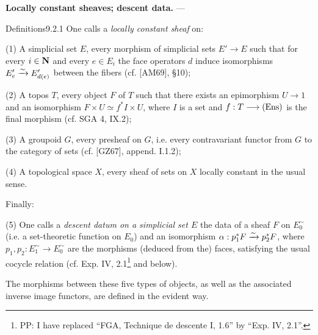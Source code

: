 \textbf{Locally constant sheaves; descent data.} ---
\begin{enoncerm}{Definitions}{9.2.1}\label{X.9.2.1}
One calls a \emph{locally constant sheaf} on:

(1) A simplicial set $E$, every morphism of simplicial sets $E'\to E$ such that for every $i\in\mathbf{N}$ and every $e\in E_i$ the face operators $d$ induce isomorphisms $E'_e\xrightarrow{\sim} E'_{d(e)}$ between the fibers (cf. [AM69], \S10);

(2) A topos $T$, every object $F$ of $T$ such that there exists an epimorphism $U\to1$ and an isomorphism $F\times U\simeq f^*I\times U$, where $I$ is a set and $f:T\longrightarrow\textup{(Ens)}$ is the final morphism (cf. SGA 4, IX.2);

(3) A groupoid $G$, every presheaf on $G$, i.e. every contravariant functor from $G$ to the category of sets (cf. [GZ67], append. I.1.2);

(4) A topological space $X$, every sheaf of sets on $X$ locally constant in the usual sense.

Finally:

(5) One calls a \emph{descent datum on a simplicial set $E$} the data of a sheaf $F$ on $E_0^\sim$ (i.e. a set-theoretic function on $E_0$) and an isomorphism $\alpha:p_1^*F\xrightarrow{\sim} p_2^*F$, where $p_1,p_2:E_1^\sim\to E_0^\sim$ are the morphisms (deduced from the) faces, satisfying the usual cocycle relation (cf. Exp. IV, 2.1\footnote{PP: I have replaced ``FGA, Technique de descente I, 1.6'' by ``Exp. IV, 2.1''.} and below).
\end{enoncerm}
The morphisms between these five types of objects, as well as the associated inverse image functors, are defined in the evident way.

